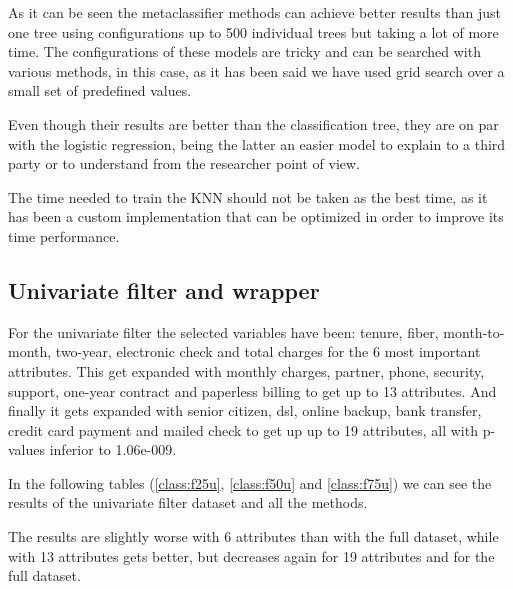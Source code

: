 \documentclass[a4paper,11pt]{article}
\begin{document}
As it can be seen the metaclassifier methods can achieve better results than just one tree using configurations up to 500 individual trees but taking a lot of more time. The configurations of these models are tricky and can be searched with various methods, in this case, as it has been said we have used grid search over a small set of predefined values.

Even though their results are better than the classification tree, they are on par with the logistic regression, being the latter an easier model to explain to a third party or to understand from the researcher point of view.

The time needed to train the KNN should not be taken as the best time, as it has been a custom implementation that can be optimized in order to improve its time performance.

\subsection{Univariate filter and wrapper}

For the univariate filter the selected variables have been: tenure, fiber, month-to-month, two-year, electronic check and total charges for the 6 most important attributes. This get expanded with monthly charges, partner, phone, security, support, one-year contract and paperless billing to get up to 13 attributes. And finally it gets expanded with senior citizen, dsl, online backup, bank transfer, credit card payment and mailed check to get up up to 19 attributes, all with p-values inferior to 1.06e-009.

In the following tables (\ref{class:f25u}, \ref{class:f50u} and \ref{class:f75u}) we can see the results of the univariate filter dataset and all the methods.

The results are slightly worse with 6 attributes than with the full dataset, while with 13 attributes gets better, but decreases again for 19 attributes and for the full dataset.
\end{document}

